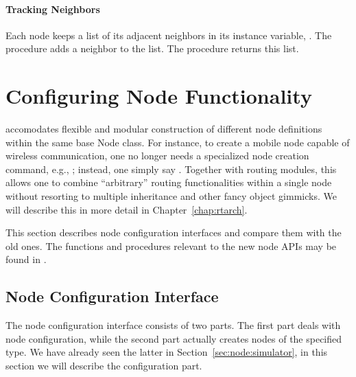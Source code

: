 \paragraph{Tracking Neighbors}
Each node keeps a list of its adjacent neighbors in its instance variable,
.  The procedure  adds a neighbor to the list.  The procedure  returns this list.

\section{Configuring Node Functionality}
\label{sec:node:nodeconfig}

 accomodates flexible and modular
construction of different node definitions within the same base Node
class.
For instance, to create a mobile node capable
of wireless communication, one no longer needs a specialized node
creation command, e.g., ; instead, one
simply say .
Together with routing modules, this allows
one to combine ``arbitrary'' routing functionalities within a single
node without resorting to multiple inheritance and other fancy object
gimmicks. 
We will describe this in more detail in Chapter~\ref{chap:rtarch}.

This section describes node configuration interfaces and compare them with
the old ones. 
The functions and procedures relevant to the new node APIs may be
found in .


\subsection{Node Configuration Interface}
\label{sec:newnode-API}

The node configuration interface consists of two parts. 
The first part deals with node configuration, while the second part
actually creates nodes of the specified type. 
We have already seen the latter in Section~\ref{sec:node:simulator},
in this section we will describe the configuration part. 

